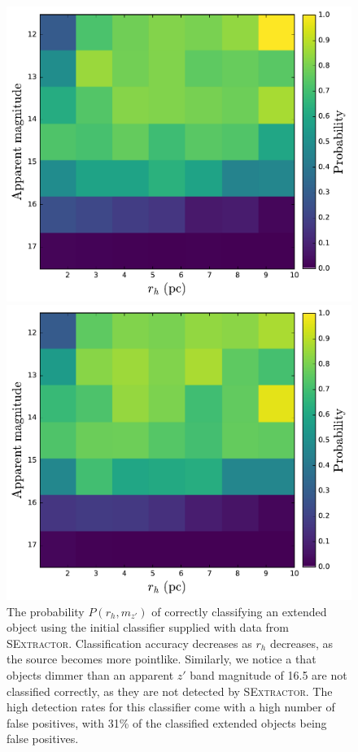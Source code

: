 \documentclass[useAMS,usenatbib]{mn2e}
\begin{document}
\begin{figure}
	\centering
	\begin{minipage}[t]{.49\textwidth}
	\includegraphics[width=\textwidth]{images/classifier_1.pdf}
	\caption{The probability $P(r_h, m_{z'})$ of correctly classifying an extended object using the initial classifier supplied with data from \textsc{SExtractor}. Classification accuracy decreases as $r_h$ decreases, as the source becomes more pointlike. Similarly, we notice a that objects dimmer than an apparent $z'$ band magnitude of 16.5 are not classified correctly, as they are not detected by \textsc{SExtractor}. The high detection rates for this classifier come with a high number of false positives, with 31\% of the classified extended objects being false positives.}
	\label{fig:comp1}
	\end{minipage}\hfill
	\begin{minipage}[t]{.49\textwidth}
		\includegraphics[width=\textwidth]{images/classifier_2.pdf}

\end{minipage}
\end{figure}
\end{document}
